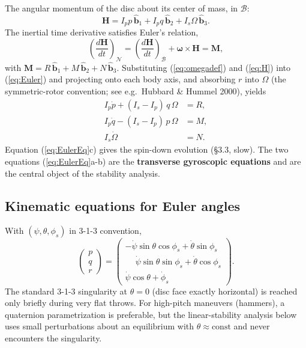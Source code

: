 \documentclass[11pt,letterpaper]{article}
\begin{document}
The angular momentum of the disc about its center of mass, in $\mathcal{B}$:
\begin{equation}
\mathbf{H} = I_p p\,\hat{\mathbf{b}}_1 + I_p q\,\hat{\mathbf{b}}_2 + I_s \Omega\,\hat{\mathbf{b}}_3.
\label{eq:H}
\end{equation}
The inertial time derivative satisfies Euler's relation,
\begin{equation}
\left(\frac{d\mathbf{H}}{dt}\right)_{\mathcal{N}} = \left(\frac{d\mathbf{H}}{dt}\right)_{\mathcal{B}} + \boldsymbol{\omega} \times \mathbf{H} = \mathbf{M},
\label{eq:Euler}
\end{equation}
with $\mathbf{M} = R\,\hat{\mathbf{b}}_1 + M\,\hat{\mathbf{b}}_2 + N\,\hat{\mathbf{b}}_3$. Substituting (\ref{eq:omegadef}) and (\ref{eq:H}) into (\ref{eq:Euler}) and projecting onto each body axis, and absorbing $r$ into $\Omega$ (the symmetric-rotor convention; see e.g.\ Hubbard \& Hummel 2000), yields
\begin{equation}
\begin{aligned}
I_p \dot{p} + (I_s - I_p)\,q\,\Omega &= R, \\
I_p \dot{q} - (I_s - I_p)\,p\,\Omega &= M, \\
I_s \dot{\Omega} &= N.
\end{aligned}
\label{eq:EulerEq}
\end{equation}
Equation (\ref{eq:EulerEq}c) gives the spin-down evolution (\S3.3, slow). The two equations (\ref{eq:EulerEq}a-b) are the \textbf{transverse gyroscopic equations} and are the central object of the stability analysis.

\subsection{Kinematic equations for Euler angles}

With $(\psi, \theta, \phi_s)$ in 3-1-3 convention,
\begin{equation}
\begin{pmatrix} p \\ q \\ r \end{pmatrix}
=
\begin{pmatrix}
-\dot{\psi}\sin\theta\cos\phi_s + \dot{\theta}\sin\phi_s \\
\phantom{-}\dot{\psi}\sin\theta\sin\phi_s + \dot{\theta}\cos\phi_s \\
\dot{\psi}\cos\theta + \dot{\phi}_s
\end{pmatrix}.
\label{eq:Eulerkin}
\end{equation}
The standard 3-1-3 singularity at $\theta = 0$ (disc face exactly horizontal) is reached only briefly during very flat throws. For high-pitch maneuvers (hammers), a quaternion parametrization is preferable, but the linear-stability analysis below uses small perturbations about an equilibrium with $\theta \approx \text{const}$ and never encounters the singularity.
\end{document}
